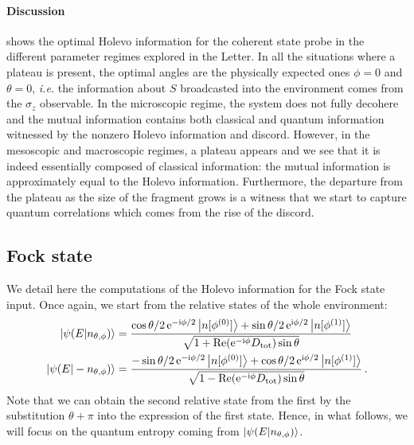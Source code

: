 \paragraph{Discussion}  shows the optimal Holevo 
information for the coherent state probe in the different parameter regimes 
explored in the Letter. In all the situations where a plateau is present, the optimal
angles are the physically expected ones $\phi = 0$ and $\theta=0$, \textit{i.e.} the
information about $S$ broadcasted into the environment comes from the
$\sigma_z$ observable. In the microscopic regime, the system does not fully
decohere and the mutual information contains
both classical and quantum information witnessed by the nonzero Holevo information
and discord. However, in the mesoscopic and macroscopic regimes, a plateau
appears and we see that it is indeed essentially composed of classical 
information: the mutual information is approximately equal to the Holevo
information. Furthermore, the departure from the plateau as the size of
the fragment grows is a witness that we start to capture quantum 
correlations which comes from the rise of the discord.

\subsection{Fock state}

We detail here the computations of the Holevo information for
the Fock state input. Once again, we start from the relative states of
the whole environment:
%
\begin{align}
\ket{\psi(E|n_{\theta,\phi})} &= 
	\frac{\cos\theta/2 \, \mathrm{e}^{-\mathrm{i} \phi/2} \ket{n[\phi^{(0)}]} + 
		\sin\theta/2 \, \mathrm{e}^{\mathrm{i} \phi/2} \ket{n[\phi^{(1)}]}}{\sqrt{
	1 +\text{Re}(\mathrm{e}^{-\mathrm{i} \phi} D_{\text{tot}}) \sin\theta}}
\\
\ket{\psi(E|-n_{\theta,\phi})} &= 
	\frac{-\sin\theta/2 \, \mathrm{e}^{-\mathrm{i} \phi/2} \ket{n[\phi^{(0)}]} + 
		\cos\theta/2 \, \mathrm{e}^{\mathrm{i} \phi/2} \ket{n[\phi^{(1)}]}}{\sqrt{
	1 -\text{Re}(\mathrm{e}^{-\mathrm{i} \phi} D_{\text{tot}} ) \sin\theta}}
\,.
\end{align}
Note that we can obtain the second relative state from the first by the
substitution $\theta + \pi$ into the expression of the first state.
Hence, in what follows, we will focus on the quantum entropy 
coming from $\ket{\psi(E|n_{\theta,\phi})}$.

